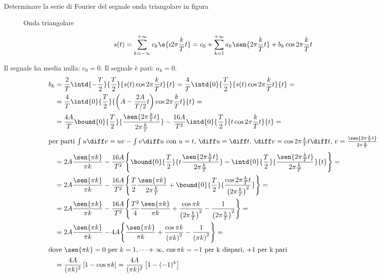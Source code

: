 \begin{esercizio}
Determinare la serie di Fourier del segnale onda triangolare in figura
\begin{figure}[!ht]
	\centering
	\caption{Onda triangolare}
	\label{fig:onda_triangolare}
\end{figure}

\[
	s(t)=\sum_{k=-\infty}^{+\infty}{c_k \e{\imath 2\pi\frac{k}{T}t}} =c_0+\sum_{k=1}^{+\infty}{a_k\sen{2\pi\frac{k}{T}t}+b_k\cos{2\pi\frac{k}{T}t}}
\]

Il segnale ha media nulla: $c_0=0$. Il segnale è pari: $a_k=0$.
\begin{align*}
	b_k&=\frac{2}{T}\intd{-\frac{T}{2}}{\frac{T}{2}}{s(t)\cos{2\pi\frac{k}{T}t}}{t}=\frac{4}{T}\intd{0}{\frac{T}{2}}{s(t)\cos{2\pi\frac{k}{T}t}}{t}=\\
	&=\frac{4}{T}\intd{0}{\frac{T}{2}}{\left(A-\frac{2 A}{T/2}t\right)\cos{2\pi\frac{k}{T}t}}{t}=\\
	&=\frac{4A}{T}\bound{0}{\frac{T}{2}}{\frac{\sen{2\pi\frac{k}{T}t}}{2\pi\frac{k}{T}}} -\frac{16A}{T^2}\intd{0}{\frac{T}{2}}{t\cos{2\pi\frac{k}{T}t}}{t}=\\
	\intertext{per parti $\int u\diff v= u v-\int v\diff u$ con $u=t$, $\diff u=\diff t$, $\diff v=\cos{2\pi\frac{k}{T}t}\diff t$, $v=\frac{\sen{2\pi\frac{k}{T}t}}{2\pi\frac{k}{T}}$}
	&=2A \frac{\sen{\pi k}}{\pi k}-\frac{16A}{T^2}{\left\lbrace \bound{0}{\frac{T}{2}}{t\frac{\sen{2\pi\frac{k}{T}t}}{2\pi\frac{k}{T}}}-\intd{0}{\frac{T}{2}}{\frac{\sen{2\pi\frac{k}{T}t}}{2\pi\frac{k}{T}}}{t}\right\rbrace}=\\
	&=2A \frac{\sen{\pi k}}{\pi k}-\frac{16A}{T^2}{\left\lbrace\frac{T}{2}\frac{\sen{\pi k}}{2\pi\frac{k}{T}}+\bound{0}{\frac{T}{2}}{\frac{\cos{2\pi\frac{k}{T}t}}{\left(2\pi\frac{k}{T}\right)^2}}\right\rbrace}=\\
	&=2A \frac{\sen{\pi k}}{\pi k}-\frac{16A}{T^2}{\left\lbrace\frac{T^2}{4}\frac{\sen{\pi k}}{\pi k}+\frac{\cos{\pi k}}{\left(2\pi\frac{k}{T}\right)^2}-\frac{1}{\left(2\pi\frac{k}{T}\right)^2}\right\rbrace}=\\
	&=2A \frac{\sen{\pi k}}{\pi k}-4A{\left\lbrace\frac{\sen{\pi k}}{\pi k}+\frac{\cos{\pi k}}{\left(\pi k\right)^2}-\frac{1}{\left(\pi k\right)^2}\right\rbrace}=\\
	\intertext{dove $\sen{\pi k}=0$ per $k=1,\dots+\infty$, $\cos{\pi k}=-1$ per k dispari, $+1$ per k pari}
	&=\frac{4A}{(\pi k)^2}\left[1-\cos{\pi k}\right] = \frac{4A}{(\pi k)^2}\left[1-(-1)^k\right]
\end{align*}
\end{esercizio}

